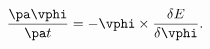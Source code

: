 \begin{equation} \label{LLeqn}
 \frac{\pa\vphi}{\pa t} = - \vphi\times\frac{\delta E}{\delta\vphi}.
\end{equation}

